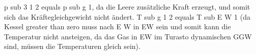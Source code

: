 p sub 3 1 2 equals p sub g 1, da die Leere zusätzliche Kraft erzeugt, und somit sich das Kräftegleichgewicht nicht ändert. T sub g 1 2 equals T sub E W 1 (da Kessel greater than zero muss nach E W in EW sein und somit kann die Temperatur nicht ansteigen, da das Gas in EW im Turasto dynamischen GGW sind, müssen die Temperaturen gleich sein).